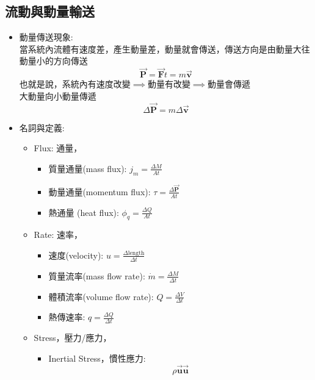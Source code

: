 \documentclass[../main.tex]{subfiles}
\begin{document}
\subsection{流動與動量輸送}
\begin{itemize}
  \item 動量傳送現象:\\
  當系統內流體有速度差，產生動量差，動量就會傳送，傳送方向是由動量大往動量小的方向傳送
  \begin{equation}
    \vec {\bm P} = \vec {\bm F} t = m \vec {\bm v}
  \end{equation}
  也就是說，系統內有速度改變$\implies$動量有改變$\implies$動量會傳遞\\
  大動量向小動量傳遞
  \begin{equation}
    \Delta \vec {\bm P} = m \Delta \vec {\bm v}
  \end{equation}
  \item 名詞與定義:
  \begin{itemize}
    \item Flux: 通量，
      \begin{itemize}
        \item 質量通量(mass flux): $j_m = \frac{\Delta M}{A t}$
        \item 動量通量(momentum flux): $\tau = \frac{\Delta \vec {\bm P}}{A t}$
        \item 熱通量 (heat flux): $\phi_q = \frac{\Delta Q}{A t}$
      \end{itemize}
    \item Rate: 速率，
      \begin{itemize}
        \item 速度(velocity): $u = \frac{\Delta \text{length}}{\Delta t}$
        \item 質量流率(mass flow rate): $\dot m = \frac{\Delta M}{\Delta t}$
        \item 體積流率(volume flow rate): $Q  = \frac{\Delta V}{\Delta t}$
        \item 熱傳速率: $q  = \frac{\Delta Q}{\Delta t}$
      \end{itemize}
    \item Stress，壓力/應力，
      \begin{itemize}
        \item Inertial Stress，慣性應力:
        \begin{equation}
          \rho \vec {\bm u} \vec {\bm u}
        \end{equation}

\end{itemize}
\end{itemize}
\end{itemize}
\end{document}
